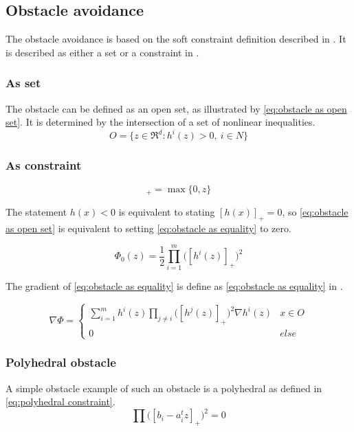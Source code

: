 		\subsection{Obstacle avoidance}
			The obstacle avoidance is based on the soft constraint definition described in \cite{AjaySathya2017}. It is described as either a set or a constraint in \cite{AjaySathya2017}.
			\subsubsection{As set}
				 The obstacle can be defined as an open set, as illustrated by \eqref{eq:obstacle as open set}. It is determined by the intersection of a set of nonlinear inequalities.
				\begin{equation}
					O = \{ z \in \Re^d : h^i(z)>0,\ i \in N \}
					\label{eq:obstacle as open set}
				\end{equation}
				
			\subsubsection{As constraint}
				\begin{equation}
					[z]_+ =  \max\{0,z\}
				\end{equation}
				
				The statement $h(x)<0$ is equivalent to stating $[h(x)]_+=0$, so \eqref{eq:obstacle as open set} is equivalent to setting \eqref{eq:obstacle as equality} to zero.
				
				\begin{equation}
					\Phi_0(z) =  \frac{1}{2} \prod_{i=1}^m \Big( [h^i(z)]_+ \Big)^2
					\label{eq:obstacle as equality}
				\end{equation}
				
				The gradient of \eqref{eq:obstacle as equality} is define as \eqref{eq:obstacle as equality} in \cite{AjaySathya2017}.
				
				\begin{equation}
					\nabla \Phi =
					\begin{cases}
						\sum_{i=1}^{m} h^i(z)\prod_{j \ne i} \Big( [h^j(z)]_+ \Big)^2 \nabla h^i(z)
						& x \in O \\
						0 & else
					\end{cases}
					\label{eq:derivative obstacle as equality}
				\end{equation}
			
			\subsubsection{Polyhedral obstacle}
				A simple obstacle example of such an obstacle is a polyhedral as defined in \eqref{eq:polyhedral constraint}.
				\begin{equation}
					\prod \Big([b_i - a_i^t z]_+ \Big)^2 = 0
					\label{eq:polyhedral constraint}
				\end{equation}
			
